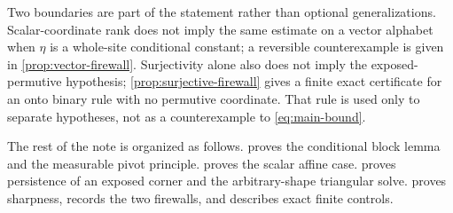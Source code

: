 Two boundaries are part of the statement rather than optional
generalizations.  Scalar-coordinate rank does not imply the same estimate on
a vector alphabet when $\eta$ is a whole-site conditional constant; a
reversible counterexample is given in \cref{prop:vector-firewall}.
Surjectivity alone also does not imply the exposed-permutive hypothesis;
\cref{prop:surjective-firewall} gives a finite exact certificate for an onto
binary rule with no permutive coordinate.  That rule is used only to separate
hypotheses, not as a counterexample to \eqref{eq:main-bound}.

The rest of the note is organized as follows.
 proves the conditional block lemma and the measurable
pivot principle.   proves the scalar affine case.
 proves persistence of an exposed corner and the
arbitrary-shape triangular solve.   proves sharpness, records
the two firewalls, and describes exact finite controls.

